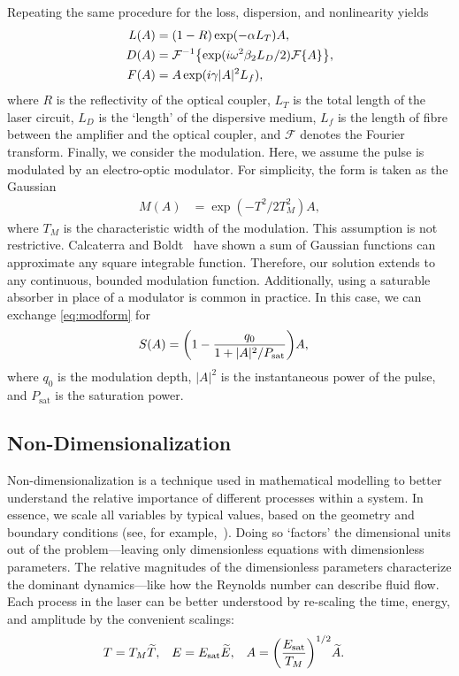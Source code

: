 \documentclass[9pt,twocolumn,twoside]{osajnl}
\let\originalleft\left
\let\originalright\right
\renewcommand{\left}{\mathopen{}\mathclose\bgroup\originalleft}
\renewcommand{\right}{\aftergroup\egroup\originalright}
\newcommand{\Es}{E_{\textrm{sat}}} %
\newcommand{\FT}[1]{\mathcal{F}\left\{ #1 \right\}} %
\newcommand{\FTi}[1]{\mathcal{F}^{-1}\left\{ #1 \right\}} %
\begin{document}
Repeating the same procedure for the loss, dispersion, and nonlinearity yields
\begin{align}
	L(A) &= (1 - R) \exp( - \alpha L_T )A, \\
	D(A) &= \FTi{\exp( i \omega^2 \beta_2 L_D/2 ) \FT{A}}, \\
	F(A) &= A \exp( i \gamma |A|^2 L_f ),
\end{align}
where $R$ is the reflectivity of the optical coupler, $L_T$ is the total length of the laser circuit, $L_D$ is the `length' of the dispersive medium, $L_f$ is the length of fibre between the amplifier and the optical coupler, and $\mathcal{F}$ denotes the Fourier transform. Finally, we consider the modulation. Here, we assume the pulse is modulated by an electro-optic modulator. For simplicity, the form is taken as the Gaussian
\begin{align}
	M(A) &= \exp( -T^2 / 2 T_M^2 ) A,
	\label{eq:modform}
\end{align}
where $T_M$ is the characteristic width of the modulation. This assumption is not restrictive. Calcaterra and Boldt~\cite{calcaterra2008a} have shown a sum of Gaussian functions can approximate any square integrable function. Therefore, our solution extends to any continuous, bounded modulation function. Additionally, using a saturable absorber in place of a modulator is common in practice. In this case, we can exchange \eqref{eq:modform} for~\cite{lapre2019, meng2020, oktem2010, woodward2018}
\begin{align}
	S(A) &= \left( 1 - \frac{q_0}{1 + |A|^2 / P_\text{sat}} \right) A,
\end{align}
where $q_0$ is the modulation depth, $|A|^2$ is the instantaneous power of the pulse, and $P_\text{sat}$ is the saturation power.

\subsection{Non-Dimensionalization}
Non-dimensionalization is a technique used in mathematical modelling to better understand the relative importance of different processes within a system. In essence, we scale all variables by typical values, based on the geometry and boundary conditions (see, for example,~\cite{howison2005}). Doing so `factors' the dimensional units out of the problem---leaving only dimensionless equations with dimensionless parameters. The relative magnitudes of the dimensionless parameters characterize the dominant dynamics---like how the Reynolds number can describe fluid flow. Each process in the laser can be better understood by re-scaling the time, energy, and amplitude by the convenient scalings:
\begin{align}
	T &= T_M \widetilde{T},& E &= \Es \widetilde{E},& A &= \left( \frac{\Es}{T_M} \right)^{1/2} \widetilde{A}.
\end{align}
\end{document}
